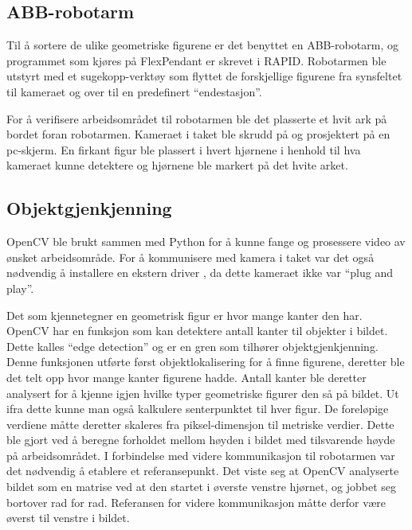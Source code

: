 \documentclass[conference]{IEEEtran}
\begin{document}
    \subsection{ABB-robotarm}
        Til å sortere de ulike geometriske figurene er det benyttet en ABB-robotarm, og programmet som kjøres på FlexPendant er skrevet i RAPID. 
        Robotarmen ble utstyrt med et sugekopp-verktøy som flyttet de forskjellige figurene fra synsfeltet til kameraet og over til en predefinert 
        \enquote{endestasjon}. 

        For å verifisere arbeidsområdet til robotarmen ble det plasserte et hvit ark på bordet foran robotarmen. Kameraet i taket ble skrudd på og 
        prosjektert på en pc-skjerm. En firkant figur ble plassert i hvert hjørnene i henhold til hva kameraet kunne detektere og hjørnene ble markert 
        på det hvite arket.

    \subsection{Objektgjenkjenning}
        OpenCV ble brukt sammen med Python for å kunne fange og prosessere video av ønsket arbeidsområde. For å kommunisere med kamera i taket 
        var det også nødvendig å installere en ekstern driver \cite{metode:kamera}, da dette kameraet ikke var “plug and play”.

        Det som kjennetegner en geometrisk figur er hvor mange kanter den har. OpenCV har en funksjon som kan detektere antall kanter til objekter i bildet. Dette kalles \enquote{edge detection} og er en gren som tilhører objektgjenkjenning. Denne funksjonen utførte først objektlokalisering for å finne figurene, deretter ble det telt opp hvor mange kanter figurene hadde. Antall kanter ble deretter analysert for å kjenne igjen hvilke typer geometriske figurer den så på bildet. Ut ifra dette kunne man også kalkulere senterpunktet til hver figur. De foreløpige verdiene måtte deretter skaleres fra piksel-dimensjon til metriske verdier. Dette ble gjort ved å beregne forholdet mellom høyden i bildet med tilsvarende høyde på arbeidsområdet. I forbindelse med videre kommunikasjon til robotarmen var det nødvendig å etablere et referansepunkt.  Det viste seg at OpenCV analyserte bildet som en matrise ved at den startet i øverste venstre hjørnet, og jobbet seg bortover rad for rad. Referansen for videre kommunikasjon måtte derfor være øverst til venstre i bildet.
\end{document}
